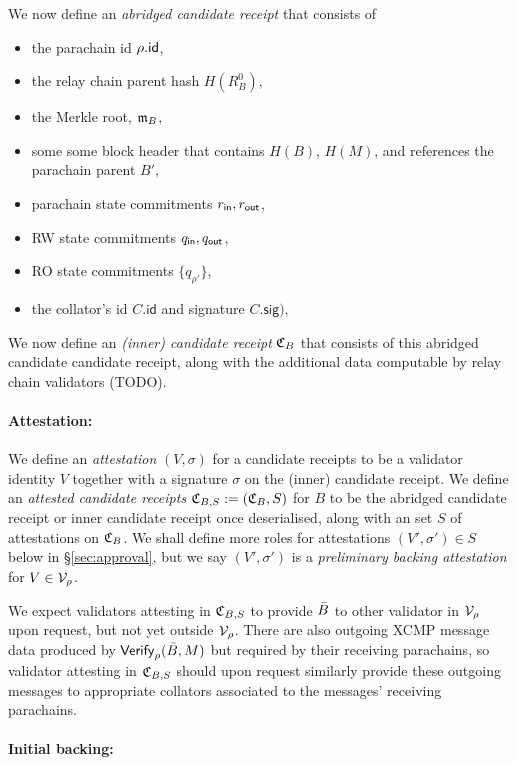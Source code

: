 We now define an {\em abridged candidate receipt} that consists of 
\begin{itemize}
\item the parachain id $\rho.\mathsf{id}$,
\item the relay chain parent hash $H(R^0_B)$, 
\item the Merkle root, $\mathfrak{m}_B$,
\item some some block header that contains $H(B)$, $H(M)$, and references the parachain parent $B'$,
\item parachain state commitments $r_{\mathsf{in}},r_{\mathsf{out}}$, 
\item RW state commitments $q_{\mathsf{in}},q_{\mathsf{out}}$,
\item RO state commitments $\{ q_{\rho'} \}$,
\item the collator's id $C.\mathsf{id}$ and signature $C.\mathsf{sig})$,
\end{itemize}

We now define an {\em (inner) candidate receipt} $\mathfrak{C}_B$ that consists of this abridged candidate candidate receipt, along with the additional data computable by relay chain validators (TODO).

\smallskip\paragraph{Attestation:}

We define an {\em attestation} $(V,\sigma)$ for a candidate receipts to be a validator identity $V$ together with a signature $\sigma$ on the (inner) candidate receipt.  We define an {\em attested candidate receipts} $\mathfrak{C}_{B,S} := (\mathfrak{C}_B,S)$ for $B$ to be the abridged candidate receipt or inner candidate receipt once deserialised, along with an set $S$ of attestations on $\mathfrak{C}_B$.  We shall define more roles for attestations $(V',\sigma') \in S$ below in \S\ref{sec:approval}, but we say $(V',\sigma')$ is a {\em preliminary backing attestation} for $V \in \mathcal{V}_{\rho}$. 

We expect validators attesting in $\mathfrak{C}_{B,S}$ to provide $\bar{B}$ to other validator in $\mathcal{V}_{\rho}$ upon request, but not yet outside $\mathcal{V}_{\rho}$.
%
There are also outgoing XCMP message data produced by $\mathsf{Verify}_{\rho}(\bar{B},M)$ but required by their receiving parachains, so validator attesting in $\mathfrak{C}_{B,S}$ should upon request similarly provide these outgoing messages to appropriate collators associated to the messages' receiving parachains. 

\smallskip\paragraph{Initial backing:}

